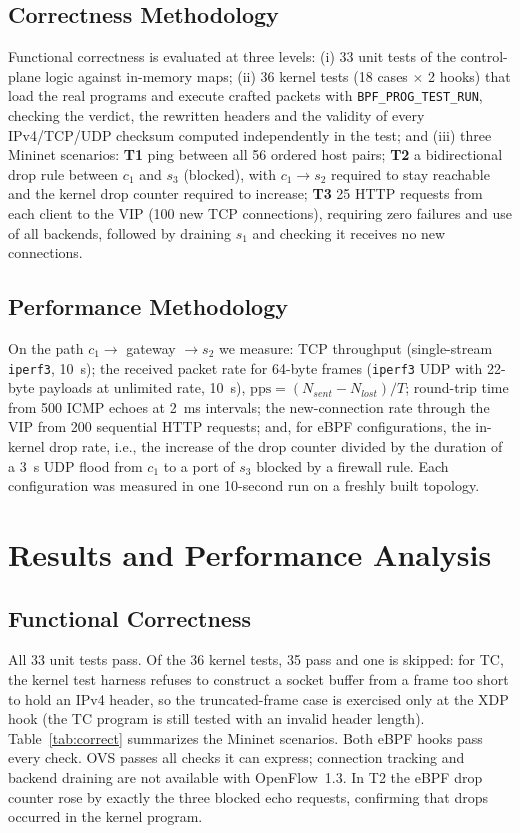 \documentclass[conference]{IEEEtran}
\begin{document}
\subsection{Correctness Methodology}
Functional correctness is evaluated at three levels:
(i) 33 unit tests of the control-plane logic against in-memory maps;
(ii) 36 kernel tests (18 cases $\times$ 2 hooks) that load the real programs
and execute crafted packets with \texttt{BPF\_PROG\_TEST\_RUN}, checking the
verdict, the rewritten headers and the validity of every IPv4/TCP/UDP checksum
computed independently in the test; and
(iii) three Mininet scenarios: \textbf{T1} ping between all 56 ordered host
pairs; \textbf{T2} a bidirectional drop rule between $c_1$ and $s_3$
(blocked), with $c_1 \to s_2$ required to stay reachable and the kernel drop
counter required to increase; \textbf{T3} 25 HTTP requests from each client
to the VIP (100 new TCP connections), requiring zero failures and use of all
backends, followed by draining $s_1$ and checking it receives no new
connections.

\subsection{Performance Methodology}
On the path $c_1 \to$ gateway $\to s_2$ we measure: TCP throughput
(single-stream \texttt{iperf3}, 10~s); the received packet rate for 64-byte
frames (\texttt{iperf3} UDP with 22-byte payloads at unlimited rate, 10~s),
$\mathrm{pps}=(N_{sent}-N_{lost})/T$; round-trip time from 500 ICMP echoes at
2~ms intervals; the new-connection rate through the VIP from 200 sequential
HTTP requests; and, for eBPF configurations, the in-kernel drop rate, i.e.,
the increase of the drop counter divided by the duration of a 3~s UDP flood
from $c_1$ to a port of $s_3$ blocked by a firewall rule. Each configuration
was measured in one 10-second run on a freshly built topology.

\section{Results and Performance Analysis}
\label{sec:results}
\subsection{Functional Correctness}
All 33 unit tests pass. Of the 36 kernel tests, 35 pass and one is skipped:
for TC, the kernel test harness refuses to construct a socket buffer from a
frame too short to hold an IPv4 header, so the truncated-frame case is
exercised only at the XDP hook (the TC program is still tested with an invalid
header length). Table~\ref{tab:correct} summarizes the Mininet scenarios. Both
eBPF hooks pass every check. OVS passes all checks it can express; connection
tracking and backend draining are not available with OpenFlow~1.3. In T2 the
eBPF drop counter rose by exactly the three blocked echo requests, confirming
that drops occurred in the kernel program.
\end{document}
